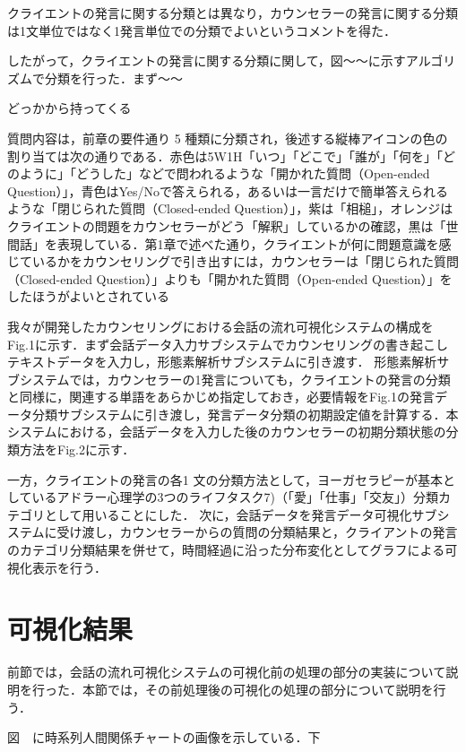 \documentclass[shuuron]{kuee}
\begin{document}
クライエントの発言に関する分類とは異なり，カウンセラーの発言に関する分類は1文単位ではなく1発言単位での分類でよいというコメントを得た．

したがって，クライエントの発言に関する分類に関して，図〜〜に示すアルゴリズムで分類を行った．まず〜〜

どっかから持ってくる


質問内容は，前章の要件通り 5 種類に分類され，後述する縦棒アイコンの色の割り当ては次の通りである．赤色は5W1H「いつ」「どこで」「誰が」「何を」「どのように」「どうした」などで問われるような「開かれた質問（Open-ended Question）」，青色はYes/Noで答えられる，あるいは一言だけで簡単答えられるような「閉じられた質問（Closed-ended Question）」，紫は「相槌」，オレンジはクライエントの問題をカウンセラーがどう「解釈」しているかの確認，黒は「世間話」を表現している．第1章で述べた通り，クライエントが何に問題意識を感じているかをカウンセリングで引き出すには，カウンセラーは「閉じられた質問（Closed-ended Question）」よりも「開かれた質問（Open-ended Question）」をしたほうがよいとされている

我々\cite{uetsuji}が開発したカウンセリングにおける会話の流れ可視化システムの構成をFig.1に示す．まず会話データ入力サブシステムでカウンセリングの書き起こしテキストデータを入力し，形態素解析サブシステムに引き渡す．
形態素解析サブシステムでは，カウンセラーの1発言についても，クライエントの発言の分類と同様に，関連する単語をあらかじめ指定しておき，必要情報をFig.1の発言データ分類サブシステムに引き渡し，発言データ分類の初期設定値を計算する．本システムにおける，会話データを入力した後のカウンセラーの初期分類状態の分類方法をFig.2に示す．


一方，クライエントの発言の各1 文の分類方法として，ヨーガセラピーが基本としているアドラー心理学の3つのライフタスク7)（「愛」「仕事」「交友」）分類カテゴリとして用いることにした．
次に，会話データを発言データ可視化サブシステムに受け渡し，カウンセラーからの質問の分類結果と，クライアントの発言のカテゴリ分類結果を併せて，時間経過に沿った分布変化としてグラフによる可視化表示を行う．


\section{可視化結果}

前節では，会話の流れ可視化システムの可視化前の処理の部分の実装について説明を行った．本節では，その前処理後の可視化の処理の部分について説明を行う．



図　に時系列人間関係チャートの画像を示している．下
\end{document}
